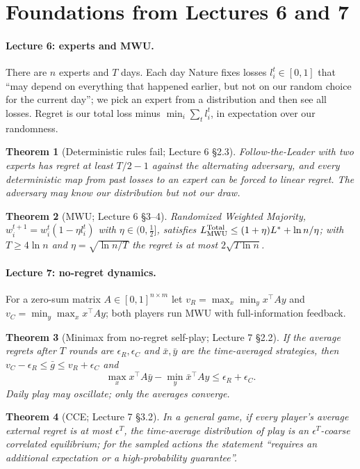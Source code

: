 \documentclass[10pt]{article}
\theoremstyle{plain}
\newtheorem{theorem}{Theorem}
\theoremstyle{definition}
\theoremstyle{remark}
\begin{document}
\section{Foundations from Lectures 6 and 7}\label{sec:lectures}

\paragraph{Lecture 6: experts and MWU.} There are $n$ experts and $T$ days. Each day Nature fixes losses
$l^t_i\in[0,1]$ that ``may depend on everything that happened earlier, but not on our random choice for the current
day''; we pick an expert from a distribution and then see all losses. Regret is our total loss minus
$\min_i\sum_tl^t_i$, in expectation over our randomness.

\begin{theorem}[Deterministic rules fail; Lecture 6 \S2.3]\label{thm:L6det}
Follow-the-Leader with two experts has regret at least $T/2-1$ against the alternating adversary, and every
deterministic map from past losses to an expert can be forced to linear regret. The adversary may know our
distribution but not our draw.
\end{theorem}
\begin{theorem}[MWU; Lecture 6 \S3--4]\label{thm:L6mwu}
Randomized Weighted Majority, $w^{t+1}_i=w^t_i(1-\eta l^t_i)$ with $\eta\in(0,\tfrac12]$, satisfies
$L^{\rm Total}_{\rm MWU}\le(1+\eta)L^*+\ln n/\eta$; with $T\ge4\ln n$ and $\eta=\sqrt{\ln n/T}$ the regret is at most
$2\sqrt{T\ln n}$.
\end{theorem}

\paragraph{Lecture 7: no-regret dynamics.} For a zero-sum matrix $A\in[0,1]^{n\times m}$ let
$v_R=\max_x\min_yx^\top Ay$ and $v_C=\min_y\max_xx^\top Ay$; both players run MWU with full-information feedback.
\begin{theorem}[Minimax from no-regret self-play; Lecture 7 \S2.2]\label{thm:L7mm}
If the average regrets after $T$ rounds are $\epsilon_R,\epsilon_C$ and $\bar x,\bar y$ are the time-averaged
strategies, then $v_C-\epsilon_R\le\bar g\le v_R+\epsilon_C$ and
\begin{equation}\label{eq:L7}
\max_xx^\top A\bar y-\min_y\bar x^\top Ay\le\epsilon_R+\epsilon_C .
\end{equation}
Daily play may oscillate; only the averages converge.
\end{theorem}
\begin{theorem}[CCE; Lecture 7 \S3.2]\label{thm:L7cce}
In a general game, if every player's average external regret is at most $\epsilon^T$, the time-average distribution of
play is an $\epsilon^T$-coarse correlated equilibrium; for the sampled actions the statement ``requires an additional
expectation or a high-probability guarantee''.
\end{theorem}
\end{document}
